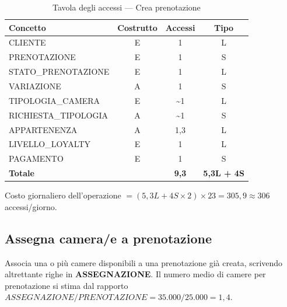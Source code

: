 \documentclass[a4paper,12pt]{report}
\begin{document}
\begin{table}[H]
    \centering
    \begin{tabular}{|l|c|c|c|}
        \hline
        \rowcolor{headerblue}
        \textbf{Concetto}    & \textbf{Costrutto} & \textbf{Accessi}   & \textbf{Tipo}      \\
        \hline
        CLIENTE              & E                  & 1                  & L                  \\
        PRENOTAZIONE         & E                  & 1                  & S                  \\
        STATO\_PRENOTAZIONE  & E                  & 1                  & L                  \\
        VARIAZIONE           & A                  & 1                  & S                  \\
        TIPOLOGIA\_CAMERA    & E                  & \textasciitilde{}1 & L                  \\
        RICHIESTA\_TIPOLOGIA & A                  & \textasciitilde{}1 & S                  \\
        APPARTENENZA         & A                  & 1,3                & L                  \\
        LIVELLO\_LOYALTY     & E                  & 1                  & L                  \\
        PAGAMENTO            & E                  & 1                  & S                  \\
        \hline
        \rowcolor{gray!25}
        \textbf{Totale}      &                    & \textbf{9,3}       & \textbf{5,3L + 4S} \\
        \hline
    \end{tabular}
    \caption{Tavola degli accessi --- Crea prenotazione}
\end{table}

Costo giornaliero dell'operazione $= (5{,}3L + 4S{\times}2) \times 23 =
        305{,}9 \approx 306$ accessi/giorno.
\newpage

\subsection{Assegna camera/e a prenotazione}
\label{sec:AssegnaCamera}

Associa una o più camere disponibili a una prenotazione già creata,
scrivendo altrettante righe in \textbf{ASSEGNAZIONE}. Il numero medio di
camere per prenotazione si stima dal rapporto
${ASSEGNAZIONE}/{PRENOTAZIONE} = 35.000/25.000 = 1{,}4$.
\end{document}
